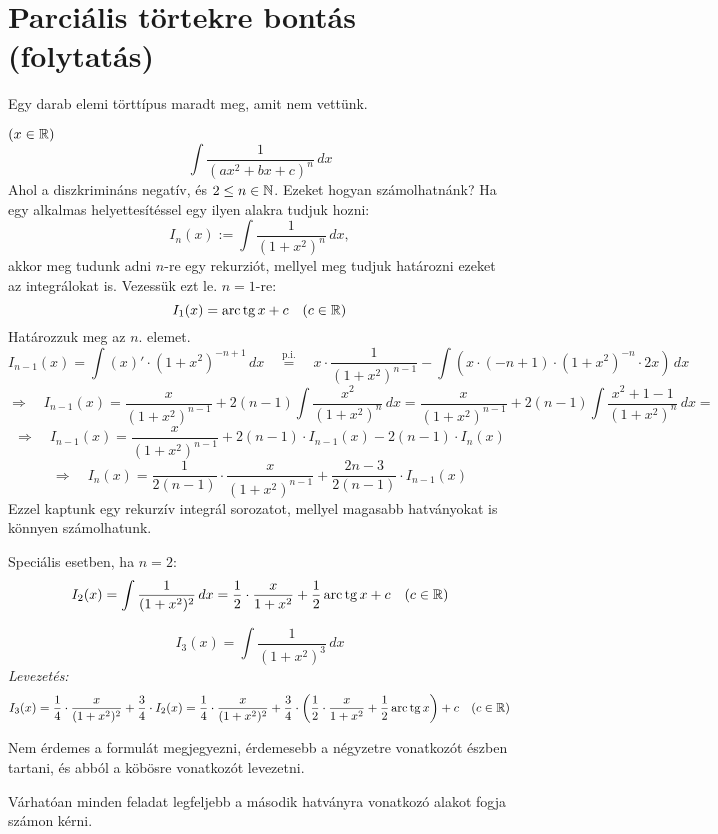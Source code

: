 \documentclass[a4paper,11.5pt]{article}
\DeclareMathOperator{\tg}{tg}
\DeclareMathOperator{\arc}{arc}
\begin{document}
	\section{Parciális törtekre bontás (folytatás)}
	Egy darab elemi törttípus maradt meg, amit nem vettünk.
	\begin{example}$(x\in\mathbb{R})$
		\[ \int\frac{1}{(ax^2+bx+c)^n}\,dx \]
		Ahol a diszkrimináns negatív, és $2\leq n\in\mathbb{N}$. Ezeket hogyan számolhatnánk? Ha egy alkalmas helyettesítéssel egy ilyen alakra tudjuk hozni:
		\[ I_n(x):=\int\frac{1}{(1+x^2)^n}\,dx, \]
		akkor meg tudunk adni $n$-re egy rekurziót, mellyel meg tudjuk határozni ezeket az integrálokat is. Vezessük ezt le. $n=1$-re:
		\[I_1(x)=\arc\tg x+c\quad (c\in\R) \]
		Határozzuk meg az $n.$ elemet.
		\[ I_{n-1}(x)=\int(x)'\cdot(1+x^2)^{-n+1}\,dx\quad \overset{\text{p.i.}}{=}\quad x\cdot\frac{1}{(1+x^2)^{n-1}}-\int \left(x\cdot(-n+1)\cdot(1+x^2)^{-n}\cdot2x\right)\,dx \]
		\[ \Rightarrow\quad I_{n-1}(x)=\frac{x}{(1+x^2)^{n-1}}+2(n-1)\int\frac{x^2}{(1+x^2)^n}\,dx=\frac{x}{(1+x^2)^{n-1}}+2(n-1)\int\frac{x^2+1-1}{(1+x^2)^n}\,dx= \]
		\[ \Rightarrow\quad I_{n-1}(x)=\frac{x}{(1+x^2)^{n-1}}+2(n-1)\cdot I_{n-1}(x)-2(n-1)\cdot I_n(x) \]
		\[ \Rightarrow\quad I_n(x)=\frac{1}{2(n-1)}\cdot\frac{x}{(1+x^2)^{n-1}}+\frac{2n-3}{2(n-1)}\cdot I_{n-1}(x) \]
		Ezzel kaptunk egy rekurzív integrál sorozatot, mellyel magasabb hatványokat is könnyen számolhatunk.
	\end{example}
	\begin{note}
		Speciális esetben, ha $n=2$:
		\[ I_2(x)=\int\frac{1}{(1+x^2)^2}\,dx=\frac{1}{2}\cdot\frac{x}{1+x^2}+\frac{1}{2}\arc\tg x+c\quad (c\in\R) \]
	\end{note}
	\begin{exercise}
		\[ I_3(x)=\int\frac{1}{(1+x^2)^3}\,dx \]
		\textit{Levezetés:}
		\[ I_3(x)=\frac{1}{4}\cdot\frac{x}{(1+x^2)^2}+\frac{3}{4}\cdot I_2(x) =\frac{1}{4}\cdot\frac{x}{(1+x^2)^2}+\frac{3}{4}\cdot \left(\frac{1}{2}\cdot\frac{x}{1+x^2}+\frac{1}{2}\arc\tg x\right)+c\quad (c\in\R) \]
	\end{exercise}
	\begin{note}
		Nem érdemes a formulát megjegyezni, érdemesebb a négyzetre vonatkozót észben tartani, és abból a köbösre vonatkozót levezetni.
	\end{note}
	\begin{note}
		Várhatóan minden feladat legfeljebb a második hatványra vonatkozó alakot fogja számon kérni.
	\end{note}
\end{document}

